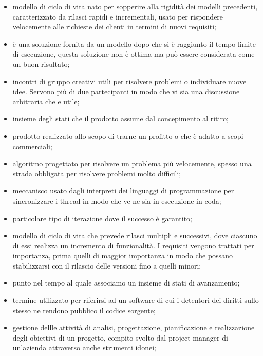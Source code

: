 
\begin{itemize} 
	\item {} modello di ciclo di vita nato per sopperire alla rigidità dei modelli precedenti, caratterizzato da rilasci rapidi e incrementali, usato per rispondere velocemente alle richieste dei clienti in termini di nuovi requisiti;
	\item {} è una soluzione fornita da un modello dopo che si è raggiunto il tempo limite di esecuzione, questa soluzione non è ottima ma può essere considerata come un buon risultato;
	\item {} incontri di gruppo creativi utili per risolvere problemi o individuare nuove idee. Servono più di due partecipanti in modo che vi sia una discussione arbitraria che e utile;
	\item {} insieme degli stati che il prodotto assume dal concepimento al ritiro;
	\item {} prodotto realizzato allo scopo di trarne un profitto o che è adatto a scopi commerciali;
	\item {} algoritmo progettato per risolvere un problema più velocemente, spesso una strada obbligata per risolvere problemi molto difficili;
	\item {} meccanisco usato dagli interpreti dei linguaggi di programmazione per sincronizzare i thread in modo che ve ne sia in esecuzione in coda;
	\item {} particolare tipo di iterazione dove il successo è garantito;
	\item {} modello di ciclo di vita che prevede rilasci multipli e successivi, dove ciascuno di essi realizza un incremento di funzionalità. I requisiti vengono trattati per importanza, prima quelli di maggior importanza in modo che possano stabilizzarsi con il rilascio delle versioni fino a quelli minori;
	\item {} punto nel tempo al quale associamo un insieme di stati di avanzamento;
	\item {} termine utilizzato per riferirsi ad un software di cui i detentori dei diritti sullo stesso ne rendono pubblico il codice sorgente;
	\item {} gestione dellle attività di analisi, progettazione, pianificazione e realizzazione degli obiettivi di un progetto, compito svolto dal project manager di un'azienda attraverso anche strumenti idonei;

\end{itemize}
